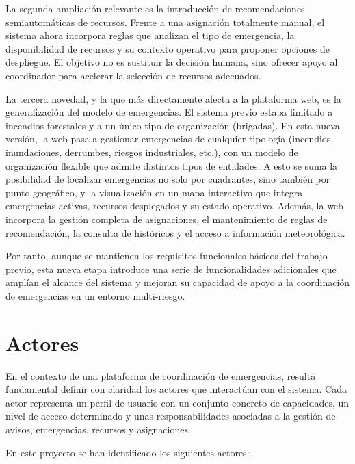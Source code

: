 La segunda ampliación relevante es la introducción de recomendaciones semiautomáticas de recursos. Frente a una asignación totalmente manual, el sistema ahora incorpora reglas que analizan el tipo de emergencia, la disponibilidad de recursos y su contexto operativo para proponer opciones de despliegue. El objetivo no es sustituir la decisión humana, sino ofrecer apoyo al coordinador para acelerar la selección de recursos adecuados.

La tercera novedad, y la que más directamente afecta a la plataforma web, es la generalización del modelo de emergencias. El sistema previo estaba limitado a incendios forestales y a un único tipo de organización (brigadas). En esta nueva versión, la web pasa a gestionar emergencias de cualquier tipología (incendios, inundaciones, derrumbes, riesgos industriales, etc.), con un modelo de organización flexible que admite distintos tipos de entidades. A esto se suma la posibilidad de localizar emergencias no solo por cuadrantes, sino también por punto geográfico, y la visualización en un mapa interactivo que integra emergencias activas, recursos desplegados y su estado operativo. Además, la web incorpora la gestión completa de asignaciones, el mantenimiento de reglas de recomendación, la consulta de históricos y el acceso a información meteorológica. 

Por tanto, aunque se mantienen los requisitos funcionales básicos del trabajo previo, esta nueva etapa introduce una serie de funcionalidades adicionales que amplían el alcance del sistema y mejoran su capacidad de apoyo a la coordinación de emergencias en un entorno multi-riesgo.

\section{Actores}

En el contexto de una plataforma de coordinación de emergencias, resulta fundamental definir con claridad los actores que interactúan con el sistema. Cada actor representa un perfil de usuario con un conjunto concreto de capacidades, un nivel de acceso determinado y unas responsabilidades asociadas a la gestión de avisos, emergencias, recursos y asignaciones.

En este proyecto se han identificado los siguientes actores:

